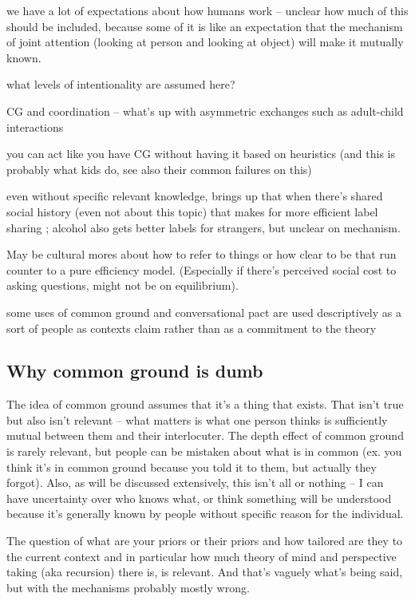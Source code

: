 \documentclass[]{article}
\begin{document}
we have a lot of expectations about how humans work -- unclear how much of this should be included, because some of it is like an expectation that the mechanism of joint attention (looking at person and looking at object) will make it mutually known. 

what levels of intentionality are assumed here? 

CG and coordination -- what's up with asymmetric exchanges such as adult-child interactions 

you can act like you have CG without having it based on heuristics (and this is probably what kids do, see also their common failures on this) 

even without specific relevant knowledge, \cite{garrison2022} brings up that when there's shared social history (even not about this topic) that makes for more efficient label sharing ; alcohol also gets better labels for strangers, but unclear on mechanism. 

May be cultural mores about how to refer to things or how clear to be that run counter to a pure efficiency model. (Especially if there's perceived social cost to asking questions, might not be on equilibrium). 

some uses of common ground and conversational pact are used descriptively as a sort of people as contexts claim \cite{leung2023} rather than as a commitment to the theory 

\subsection{Why common ground is dumb}

The idea of common ground assumes that it's a thing that exists. That isn't true but also isn't relevant -- what matters is what one person thinks is sufficiently mutual between them and their interlocuter. The depth effect of common ground is rarely relevant, but people can be mistaken about what is in common (ex. you think it's in common ground because you told it to them, but actually they forgot). Also, as will be discussed extensively, this isn't all or nothing -- I can have uncertainty over who knows what, or think something will be understood because it's generally known by people without specific reason for the individual. 

The question of what are your priors or their priors and how tailored are they to the current context and in particular how much theory of mind and perspective taking (aka recursion) there is, is relevant. And that's vaguely what's being said, but with the mechanisms probably mostly wrong. 
\end{document}
